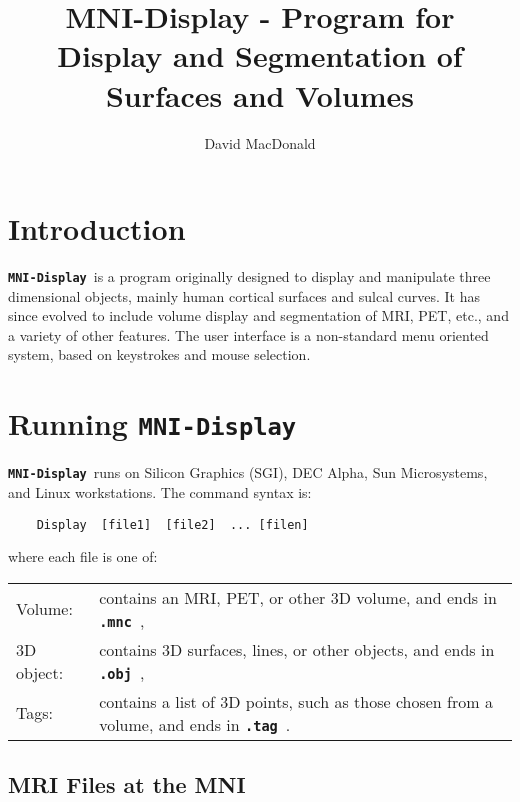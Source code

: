 \documentclass{article}
\title{{\bf MNI-Display} - Program for Display and Segmentation of Surfaces and Volumes}
\author{David MacDonald}
\newcommand{\ident}[1]{{\bf\tt #1}\ }
\newcommand{\display}{\ident{MNI-Display}}
\begin{document}
\maketitle

\newpage

\tableofcontents

\newpage

\section{Introduction}

\display is a program originally designed to display and manipulate
three dimensional objects,
mainly human cortical surfaces and sulcal curves.  It has since evolved to
include volume display and segmentation of MRI, PET, etc., and a variety of
other features.  The user interface is a non-standard menu oriented system,
based on keystrokes and mouse selection.

\section{Running \display}

\display runs on Silicon Graphics (SGI), DEC Alpha, Sun Microsystems,
and Linux workstations.
The command syntax is:

\begin{verbatim}
    Display  [file1]  [file2]  ... [filen]
\end{verbatim}

where each file is one of:

\vspace{.5cm}

\begin{tabular}[t]{p{2cm}p{8.5cm}}
Volume: &  contains an MRI, PET, or other 3D volume,
           and ends in \ident{.mnc}, \\

3D object: &  contains 3D surfaces, lines, or other objects, and
              ends in \ident{.obj}, \\

Tags:  & contains a list of 3D points, such as those chosen from a volume,
         and ends in \ident{.tag}.
\end{tabular}

\subsection{MRI Files at the MNI}
\end{document}
